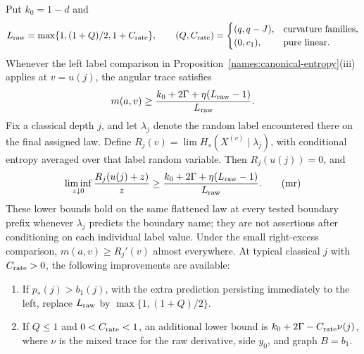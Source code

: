 \begin{proposition}\label{names:memory}
Put \(k_0=1-d\) and
\[
 L_{\rm raw}=\max\{1,(1+Q)/2,1+C_{\rm rate}\},\qquad
 (Q,C_{\rm rate})=
 \begin{cases}(q,q-J),&\text{curvature families},\\
 (0,c_1),&\text{pure linear}.
 \end{cases}
\]
Whenever the left label comparison in
Proposition~\ref{names:canonical-entropy}(iii) applies at
\(v=u(j)\), the angular trace satisfies
\[
 m(a,v)\geq
 \frac{k_0+2\Gamma+\eta(L_{\rm raw}-1)}{L_{\rm raw}}.
\]
Fix a classical depth \(j\), and let \(\lambda_j\) denote the
random label encountered there on the final assigned law. Define
\(R_j(v)=\lim H_s(X^{(v)}\mid\lambda_j)\), with conditional
entropy averaged over that label random variable.
Then \(R_j(u(j))=0\), and
\begin{equation}
 \liminf_{z\downarrow0}\frac{R_j(u(j)+z)}z
 \geq\frac{k_0+2\Gamma+\eta(L_{\rm raw}-1)}{L_{\rm raw}}.
 \tag{mr}\label{eq:mr}
\end{equation}
These lower bounds hold on the same flattened law at every tested
boundary prefix whenever \(\lambda_j\) predicts the boundary name;
they are not assertions after conditioning on each individual label
value. Under the small
right-excess comparison, \(m(a,v)\geq R_j'(v)\) almost everywhere.
At typical classical \(j\) with \(C_{\rm rate}>0\), the following
improvements are available:
\begin{enumerate}[label=(\roman*)]
\item If \(p_*(j)>b_1(j)\), with the extra prediction persisting
immediately to the left, replace \(L_{\rm raw}\) by
\(\max\{1,(1+Q)/2\}\).
\item If \(Q\leq1\) and \(0<C_{\rm rate}<1\), an additional
lower bound is \(k_0+2\Gamma-C_{\rm rate}\nu(j)\), where
\(\nu\) is the mixed trace for the raw derivative, side \(y_0\),
and graph \(B=b_1\).
\end{enumerate}
\end{proposition}

